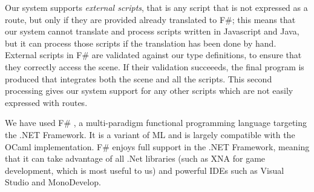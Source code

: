 Our system supports \textit{external scripts}, that is any script that is not expressed as a route, but only if they are provided already translated to F\#; this means that our system cannot translate and process scripts written in Javascript and Java, but it can process those scripts if the translation has been done by hand. External scripts in F\# are validated against our type definitions, to ensure that they correctly access the scene. If their validation succeeeds, the final program is produced that integrates both the scene and all the scripts. This second processing gives our system support for any other scripts which are not easily expressed with routes.

We have used F\# \cite{FRIENDLY_FSHARP,FSHARP}, a multi-paradigm functional programming language targeting the .NET Framework. It is a variant of ML and is largely compatible with the OCaml implementation. F\# enjoys full support in the .NET Framework, meaning that it can take advantage of all .Net libraries (such as XNA for game development, which is most useful to us) and powerful IDEs such as Visual Studio and MonoDevelop.